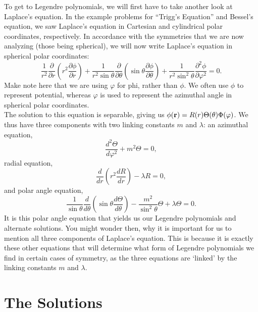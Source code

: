 \documentclass[11pt]{report}
\begin{document}
To get to Legendre polynomials, we will first have to take another look at Laplace's equation. In the example problems for ``Trigg’s Equation'' and Bessel's equation, we saw Laplace's equation in Cartesian and cylindrical polar coordinates, respectively. In accordance with the symmetries that we are now analyzing (those being spherical), we will now write Laplace's equation in spherical polar coordinates:
    \begin{equation}
        \frac{1}{r^2}\frac{\partial}{\partial r}\left(r^2\frac{\partial \phi}{\partial r}\right) + \frac{1}{r^2\sin{\theta}}\frac{\partial}{\partial\theta}\left(\sin{\theta}\frac{\partial\phi}{\partial\theta}\right) + \frac{1}{r^2\sin^2{\theta}}\frac{\partial^2\phi}{\partial\varphi^2} = 0.
    \end{equation}
Make note here that we are using $\varphi$ for phi, rather than $\phi$. We often use $\phi$ to represent potential, whereas $\varphi$ is used to represent the azimuthal angle in spherical polar coordinates.\\

The solution to this equation is separable, giving us $\phi(\bold{r}) = R(r)\Theta(\theta)\Phi(\varphi)$. We thus have three components with two linking constants $m$ and $\lambda$: an azimuthal equation,
    \begin{equation}
        \frac{d^2\Theta}{d\varphi^2} + m^2\Theta = 0,
    \end{equation}
radial equation, 
    \begin{equation}
        \frac{d}{dr}\left(r^2\frac{dR}{dr}\right) - \lambda R = 0,
    \end{equation}
and polar angle equation,
    \begin{equation}
        \frac{1}{\sin{\theta}}\frac{d}{d\theta}\left(\sin{\theta}\frac{d\Theta}{d\theta}\right) - \frac{m^2}{\sin^2{\theta}}\Theta + \lambda\Theta = 0.
    \end{equation}
It is this polar angle equation that yields us our Legendre polynomials and alternate solutions. You might wonder then, why it is important for us to mention all three components of Laplace's equation. This is because it is exactly these other equations that will determine what form of Legendre polynomials we find in certain cases of symmetry, as the three equations are `linked' by the linking constants $m$ and $\lambda$.



\section{The Solutions}
\end{document}
